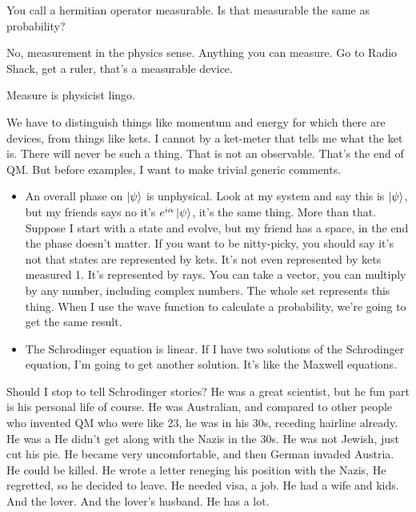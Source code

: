 \begin{question}
    You call a hermitian operator measurable.
    Is that measurable the same as probability?
\end{question}
No, measurement in the physics sense.
Anything you can measure.
Go to Radio Shack, get a ruler,
that's a measurable device.

Measure is physicist lingo.

We have to distinguish things like momentum and energy for which there are
devices,
from things like kets.
I cannot by a ket-meter that tells me what the ket is.
There will never be such a thing.
That is not an observable.
That's the end of QM.
But before examples,
I want to make trivial generic comments.


\begin{itemize}
    \item An overall phase on $\ket{\psi}$ is unphysical.
        Look at my system and say this is $\ket{\psi}$,
        but my friends says no it's $e^{i\alpha}\ket{\psi}$,
        it's the same thing.
        More than that.
        Suppose I start with a state and evolve,
        but my friend has a space,
        in the end the phase doesn't matter.
        If you want to be nitty-picky,
        you should say it's not that states are represented by kets.
        It's not even represented by kets measured 1.
        It's represented by rays.
        You can take a vector,
        you can multiply by any number,
        including complex numbers.
        The whole set represents this thing.
        When I use the wave function to calculate a probability,
        we're going to get the same result.
    \item The Schrodinger equation is linear.
        If I have two solutions of the Schrodinger equation,
        I'm going to get another solution.
        It's like the Maxwell equations.
\end{itemize}
Should I stop to tell Schrodinger stories?
He was a great scientist,
but he fun part is his personal life of course.
He was Australian,
and compared to other people who invented QM
who were like 23,
he was in his 30s,
receding hairline already.
He was a 
He didn't get along with the Nazis in the 30s.
He was not Jewish,
just cut his pie.
He became very uncomfortable,
and then German invaded Austria.
He could be killed.
He wrote a letter reneging his position with the Nazis,
He regretted,
so he decided to leave.
He needed visa, a job.
He had a wife and kids.
And the lover.
And the lover's husband.
He has a lot.
